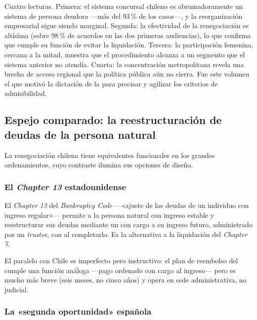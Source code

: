 \begin{foco}
Cuatro lecturas. Primera: el sistema concursal chileno es abrumadoramente un sistema de persona
deudora ---más del 93\,\% de los casos---, y la reorganización empresarial sigue siendo marginal.
Segunda: la efectividad de la renegociación es altísima (sobre 98\,\% de acuerdos en las dos
primeras audiencias), lo que confirma que cumple su función de evitar la liquidación. Tercera: la
participación femenina, cercana a la mitad, muestra que el procedimiento alcanza a un segmento que
el sistema anterior no atendía. Cuarta: la concentración metropolitana revela una brecha de acceso
regional que la política pública aún no cierra. Fue este volumen el que motivó la dictación de la
 \citeyearpar{ncg-28} para precisar y agilizar los criterios de admisibilidad.
\end{foco}

\subsection{Espejo comparado: la reestructuración de deudas de la persona natural}

La renegociación chilena tiene equivalentes funcionales en los grandes ordenamientos, cuyo
contraste ilumina sus opciones de diseño.

\subsubsection{El \emph{Chapter 13} estadounidense}

El \emph{Chapter 13} del \emph{Bankruptcy Code} \parencite{us-bankruptcy-code} ---«ajuste de las
deudas de un individuo con ingreso regular»--- permite a la persona natural con ingreso estable
 y reestructurar sus deudas mediante un  con cargo a su ingreso futuro, administrado por un \emph{trustee}, con
\discharge{} al completarlo. Es la alternativa a la liquidación del \emph{Chapter 7}.

El paralelo con Chile es imperfecto pero instructivo: el plan de reembolso del  cumple
una función análoga ---pago ordenado con cargo al ingreso--- pero es mucho más breve (seis meses,
no cinco años) y opera en sede administrativa, no judicial.

\subsubsection{La «segunda oportunidad» española}

